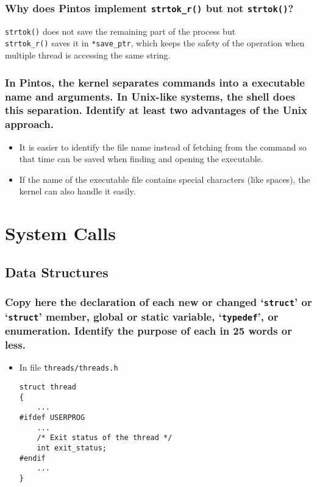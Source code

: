 \documentclass[sigconf, nonacm, balance=false, urlbreakonhyphens=true]{acmart}
\begin{document}
            \subsubsection{Why does Pintos implement \texttt{strtok\_r()} but not \texttt{strtok()}?} 

                \texttt{strtok()} does not save the remaining part of the process but \\\texttt{strtok\_r()} saves it in \texttt{*save\_ptr}, which keeps the safety of the operation when multiple thread is accessing the same string. 

            \subsubsection{In Pintos, the kernel separates commands into a executable name and arguments.  In Unix-like systems, the shell does this separation.  Identify at least two advantages of the Unix approach.} 

            \begin{itemize}
                \item It is easier to identify the file name instead of fetching from the command so that time can be saved when finding and opening the executable. 
                \item If the name of the executable file contains special characters (like spaces), the kernel can also handle it easily. 
            \end{itemize}
    
    \section{System Calls}

        \label{System Calls}

        \subsection{Data Structures}
            
            \subsubsection{Copy here the declaration of each new or changed `\texttt{struct}' or `\texttt{struct}' member, global or static variable, `\texttt{typedef}', or enumeration. Identify the purpose of each in 25 words or less. } 

                \begin{itemize}
                    \item In file \texttt{threads/threads.h}
\begin{verbatim}
struct thread
{
    ...
#ifdef USERPROG
    ...
    /* Exit status of the thread */
    int exit_status;
#endif
    ...
}\end{verbatim}
                \end{itemize}
\end{document}
